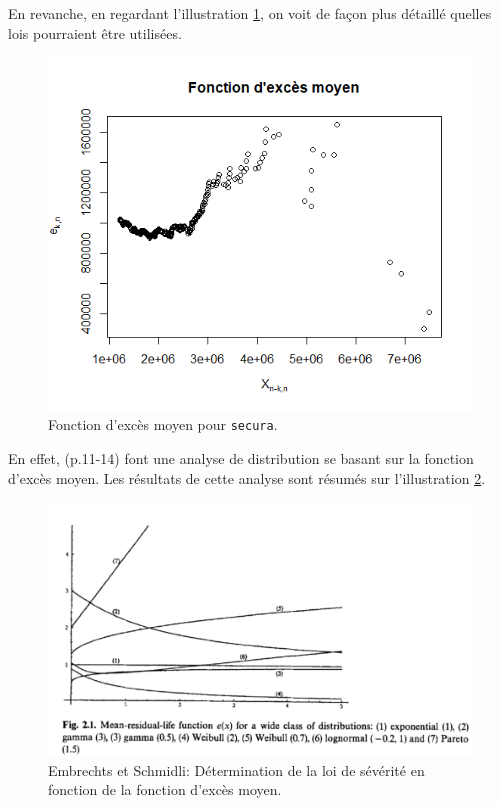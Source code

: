 		En revanche, en regardant l'illustration \ref{Graph_Secura_MeanExcess}, on voit de façon plus détaillé quelles lois pourraient être utilisées.\\
		
		\begin{figure}[H]
			\begin{center}
			\includegraphics[scale=0.45]{Graphiques/Graph_Secura_MeanExcess} 
			\renewcommand{\figurename}{Illustration}
			\caption{Fonction d'excès moyen pour \texttt{secura}.} \label{Graph_Secura_MeanExcess}
			\end{center}
		\end{figure}
		
		En effet, \cite{Embrechts1994}(p.11-14) font  une analyse de distribution se basant sur la fonction d'excès moyen. Les résultats de cette analyse sont résumés sur l'illustration \ref{Interpretation_Graph_ExcesMoyens}.
		
		\begin{figure}[H]
			\begin{center}
			\includegraphics[scale=0.45]{Graphiques/Interpretation_Graph_ExcesMoyens} 
			\renewcommand{\figurename}{Illustration}
			\caption{Embrechts et Schmidli: Détermination de la loi de sévérité en fonction de la fonction d'excès moyen.} \label{Interpretation_Graph_ExcesMoyens}
			\end{center}
		\end{figure}
		
